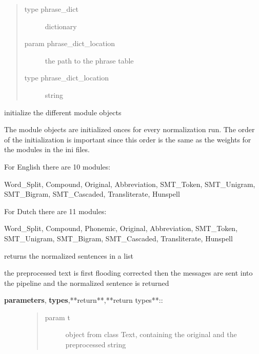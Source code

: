 \documentclass[letterpaper,10pt,english]{sphinxmanual}
\begin{document}
\begin{fulllineitems}
\begin{fulllineitems}
\begin{description}
\begin{quote}
\begin{description}
\item[{type phrase\_dict}] \leavevmode
dictionary

\item[{param phrase\_dict\_location}] \leavevmode
the path to the phrase table

\item[{type phrase\_dict\_location}] \leavevmode
string

\end{description}\end{quote}

\end{description}

\end{fulllineitems}


\begin{fulllineitems}
\label{API:norm.normalizer.Normalizer.initialize_modules}
initialize the different module objects

The module objects are initialized onces for every normalization run. The 
order of the initialization is important since this order is the same as the 
weights for the modules in the ini files.

For English there are 10 modules:

Word\_Split, Compound, Original, Abbreviation, SMT\_Token, SMT\_Unigram, SMT\_Bigram, SMT\_Cascaded, Transliterate, Hunspell

For Dutch there are 11 modules:

Word\_Split, Compound, Phonemic, Original, Abbreviation, SMT\_Token, SMT\_Unigram, SMT\_Bigram, SMT\_Cascaded, Transliterate, Hunspell

\end{fulllineitems}


\begin{fulllineitems}
\label{API:norm.normalizer.Normalizer.normalize_text}
returns the normalized sentences in a list

the preprocessed text is first flooding corrected
then the messages are sent into the pipeline and the normalized sentence is returned
\begin{description}
\item[{\textbf{parameters}, \textbf{types},**return**,**return types**::}] \leavevmode\begin{quote}\begin{description}
\item[{param t}] \leavevmode
object from class Text, containing the original and the preprocessed string


\end{description}
\end{quote}
\end{description}
\end{fulllineitems}
\end{fulllineitems}
\end{document}
